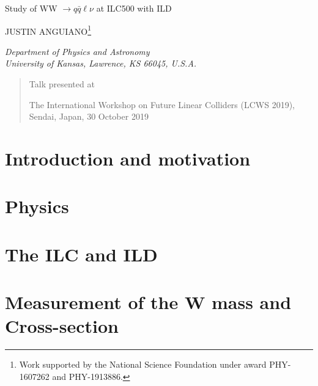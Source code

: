 \documentclass[12pt]{article}
\newcommand\pubnumber{}
\newcommand\pubdate{\today}
\def\kansas{Department of Physics and Astronomy\\
University of Kansas, Lawrence, KS 66045, U.S.A.}
\def\support{\footnote{Work supported by the National Science Foundation  
                       under award PHY-1607262 and PHY-1913886.}}
\def\Title#1{\begin{center} {\Large #1 } \end{center}}
\def\Author#1{\begin{center}{ \sc #1} \end{center}}
\def\Address#1{\begin{center}{ \it #1} \end{center}}
\newcommand\pubblock{\rightline{\begin{tabular}{l} \pubnumber\\
         \pubdate  \end{tabular}}}
\newenvironment{Abstract}{\begin{quotation}  }{\end{quotation}}
\newenvironment{Presented}{\begin{quotation} \begin{center} 
             Talk presented at \end{center}\bigskip 
      \begin{center}\begin{large}}{\end{large}\end{center} \end{quotation}}
\begin{document}
\begin{titlepage}
\pubblock

\vfill
\Title{Study of WW $\rightarrow q\bar{q}\ell\nu$ at ILC500 with ILD }
\vfill
\Author{JUSTIN ANGUIANO\support}
\Address{\kansas}
\vfill
\begin{Abstract}

\end{Abstract}
\vfill
\begin{Presented}
The International Workshop on Future Linear Colliders (LCWS 2019),\\
Sendai, Japan, 30 October 2019\\
\end{Presented}
\vfill
\end{titlepage}
\def\thefootnote{\fnsymbol{footnote}}
\setcounter{footnote}{0}
%



\section{Introduction and motivation}
\label{sec:Introduction}

\section{Physics}
\label{sec:physics}






\section{The ILC and ILD}
\label{sec:ILC_detector}



\section{Measurement of the W mass and Cross-section}
\label{Current_Work} 
\end{document}
